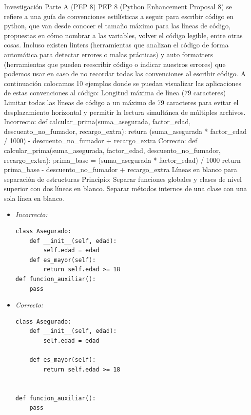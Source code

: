 \documentclass{article}
\begin{document}
Investigación
Parte A (PEP 8)
PEP 8 (Python Enhancement Proposal 8) se refiere a una guía de convenciones estilísticas a seguir para escribir código en python, que van desde conocer el tamaño máximo para las líneas de código, propuestas en cómo nombrar a las variables, volver el código legible, entre otras cosas. Incluso existen linters (herramientas que analizan el código de forma automática para detectar errores o malas prácticas) y auto formatters (herramientas que pueden reescribir código o indicar nuestros errores) que podemos usar en caso de no recordar todas las convenciones al escribir código. A continuación colocamos 10 ejemplos donde se puedan visualizar las aplicaciones de estas convenciones al código:
Longitud máxima de línea (79 caracteres)
Limitar todas las líneas de código a un máximo de 79 caracteres para evitar el desplazamiento horizontal y permitir la lectura simultánea de múltiples archivos.
Incorrecto:
def calcular_prima(suma_asegurada, factor_edad, descuento_no_fumador, recargo_extra):
    return (suma_asegurada * factor_edad / 1000) - descuento_no_fumador + recargo_extra
Correcto:
def calcular_prima(suma_asegurada, factor_edad, 
                   descuento_no_fumador, recargo_extra):
    prima_base = (suma_asegurada * factor_edad) / 1000
    return prima_base - descuento_no_fumador + recargo_extra
Líneas en blanco para separación de estructuras
    Principio: Separar funciones globales y clases de nivel superior con dos líneas en blanco. Separar métodos internos de una clase con una sola línea en blanco.
    \begin{itemize}
        \item \textit{Incorrecto:}
\begin{verbatim}
class Asegurado:
    def __init__(self, edad):
        self.edad = edad
    def es_mayor(self):
        return self.edad >= 18
def funcion_auxiliar():
    pass
\end{verbatim}
        \item \textit{Correcto:}
\begin{verbatim}
class Asegurado:
    def __init__(self, edad):
        self.edad = edad

    def es_mayor(self):
        return self.edad >= 18


def funcion_auxiliar():
    pass
\end{verbatim}
    \end{itemize}
\end{document}
